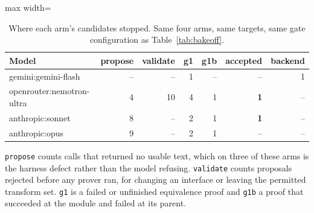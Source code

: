 \begin{table}[htbp]
  \centering
  \footnotesize
  \caption{Where each arm's candidates stopped. Same four arms, same targets, same gate configuration as Table~\ref{tab:bakeoff}.}
  \label{tab:deaths}
  \begin{adjustbox}{max width=\textwidth}
  \begin{tabular}{lrrrrrr}
    \toprule
    \textbf{Model} & \textbf{propose} & \textbf{validate} & \textbf{g1} & \textbf{g1b} & \textbf{accepted} & \textbf{backend} \\
    \midrule
    gemini:gemini-flash & -- & -- & 1 & -- & -- & 1 \\
    openrouter:nemotron-ultra & 4 & 10 & 4 & 1 & \textbf{1} & -- \\
    anthropic:sonnet & 8 & -- & 2 & 1 & \textbf{1} & -- \\
    anthropic:opus & 9 & -- & 2 & 1 & -- & -- \\
    \bottomrule
  \end{tabular}
  \end{adjustbox}
  \par\smallskip\footnotesize\raggedright \texttt{propose} counts calls that returned no usable text, which on three of these arms is the harness defect rather than the model refusing. \texttt{validate} counts proposals rejected before any prover ran, for changing an interface or leaving the permitted transform set. \texttt{g1} is a failed or unfinished equivalence proof and \texttt{g1b} a proof that succeeded at the module and failed at its parent.
\end{table}
